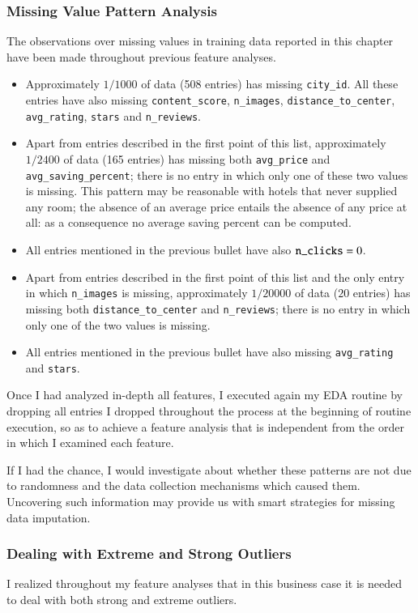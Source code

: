\documentclass[preprint,12pt,3p]{elsarticle}
\begin{document}
\subsubsection{Missing Value Pattern Analysis}
The observations over missing values in training data reported in this chapter have been made throughout previous feature analyses.
\begin{itemize}
	\item Approximately $1/1000$ of data (508 entries) has missing \verb|city_id|. All these entries have also missing \verb|content_score|, \verb|n_images|, \verb|distance_to_center|, \verb|avg_rating|, \verb|stars| and \verb|n_reviews|.
	\item Apart from entries described in the first point of this list, approximately $1/2400$ of data (165 entries) has missing both \verb|avg_price| and \verb|avg_saving_percent|; there is no entry in which only one of these two values is missing. This pattern may be reasonable with hotels that never supplied any room; the absence of an average price entails the absence of any price at all: as a consequence no average saving percent can be computed.
	\item All entries mentioned in the previous bullet have also $\verb|n_clicks|=0$.
	\item Apart from entries described in the first point of this list and the only entry in which \verb|n_images| is missing, approximately $1/20000$ of data ($20$ entries) has missing both \verb|distance_to_center| and \verb|n_reviews|; there is no entry in which only one of the two values is missing.
	\item All entries mentioned in the previous bullet have also missing \verb|avg_rating| and \verb|stars|.
\end{itemize}

Once I had analyzed in-depth all features, I executed again my EDA routine by dropping all entries I dropped throughout the process at the beginning of routine execution, so as to achieve a feature analysis that is independent from the order in which I examined each feature.

If I had the chance, I would investigate about whether these patterns are not due to randomness and the data collection mechanisms which caused them. Uncovering such information may provide us with smart strategies for missing data imputation.

\subsubsection{Dealing with Extreme and Strong Outliers}
I realized throughout my feature analyses that in this business case it is needed to deal with both strong and extreme outliers.
\end{document}
